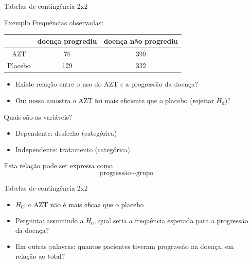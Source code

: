 \documentclass{beamer}
\begin{document}
\begin{frame}{Tabelas de contingência 2x2}
  \begin{exampleblock}{Exemplo}
    Frequências observadas:
    \begin{tabular}{c|c|c}
      & doença progrediu & doença não progrediu\\
      \hline
      AZT & 76 & 399 \\
      \hline
      Placebo & 129 & 332 \\
    \end{tabular}
  \end{exampleblock}
  \begin{itemize}
  \item Existe relação entre o uso do AZT e a progressão da doença?
  \item Ou: nessa amostra o AZT foi mais eficiente que o placebo
    (rejeitar $H_0$)?
  \end{itemize}
\end{frame}

\begin{frame}{Quais são as variáveis?}
  \begin{itemize}
    \small
  \item Dependente: desfecho (categórica)
  \item Independente: tratamento (categórica)
  \end{itemize}
  \vfill
  \begin{block}{Esta relação pode ser expressa como}
    \begin{displaymath}
      \text{progressão} \sim \text{grupo}
    \end{displaymath}
  \end{block}
\end{frame}

\begin{frame}{Tabelas de contingência 2x2}
  \begin{itemize}
  \item $H_0$: o AZT não é mais eficaz que o placebo
  \item Pergunta: assumindo a $H_0$, qual seria a frequência esperada
    para a progressão da doença?
  \item Em outras palavras: quantos pacientes tiveram progressão na
    doença, em relação ao total?
  \end{itemize}
\end{frame}
\end{document}

